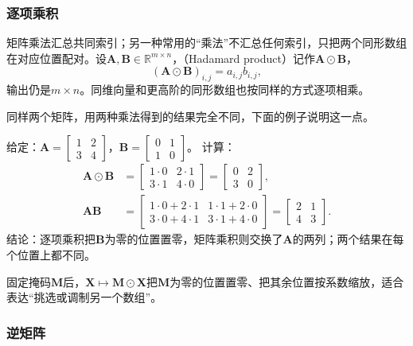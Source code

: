 \subsubsection{逐项乘积}
\label{sec:ls-hadamard-product}

矩阵乘法汇总共同索引；另一种常用的“乘法”不汇总任何索引，只把两个同形数组在对应位置配对。设$\bm A,\bm B\in\mathbb R^{m\times n}$，（Hadamard product）记作$\bm A\odot\bm B$，
\begin{equation}
 (\bm A\odot\bm B)_{i,j}=a_{i,j}b_{i,j},
 \label{eq:ls-hadamard}
\end{equation}
输出仍是$m\times n$。同维向量和更高阶的同形数组也按同样的方式逐项相乘。

同样两个矩阵，用两种乘法得到的结果完全不同，下面的例子说明这一点。
\begin{example}[逐项乘积与矩阵乘积的对比]
\label{ex:ls-hadamard-vs-matrix-product}
给定：$\bm A=\left[\begin{smallmatrix}1&2\\3&4\end{smallmatrix}\right]$，$\bm B=\left[\begin{smallmatrix}0&1\\1&0\end{smallmatrix}\right]$。
计算：
\[
 \begin{aligned}
 \bm A\odot\bm B&=\begin{bmatrix}1\cdot0&2\cdot1\\3\cdot1&4\cdot0\end{bmatrix}=\begin{bmatrix}0&2\\3&0\end{bmatrix},\\
 \bm A\bm B&=\begin{bmatrix}1\cdot0+2\cdot1&1\cdot1+2\cdot0\\3\cdot0+4\cdot1&3\cdot1+4\cdot0\end{bmatrix}=\begin{bmatrix}2&1\\4&3\end{bmatrix}.
 \end{aligned}
\]
结论：逐项乘积把$\bm B$为零的位置置零，矩阵乘积则交换了$\bm A$的两列；两个结果在每个位置上都不同。
\end{example}
固定掩码$\bm M$后，$\bm X\mapsto\bm M\odot\bm X$把$\bm M$为零的位置置零、把其余位置按系数缩放，适合表达“挑选或调制另一个数组”。

\subsubsection{逆矩阵}
\label{sec:prelim-inverse-matrices}

